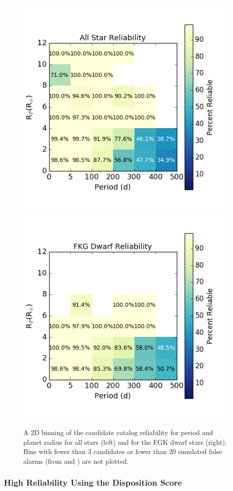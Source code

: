 \begin{figure}[h]
\begin{center}
\includegraphics[width=0.45\linewidth]{fig-AllReliabilityPR.png}
\includegraphics[width=0.45\linewidth]{fig-FgkReliabilityPR.png}
\caption{A 2D binning of the candidate catalog reliability for period and planet radius for all stars (left) and for the FGK dwarf stars (right). Bins with fewer than 3 candidates or fewer than 20 simulated false alarms (from \invtce{} and \scrtce{}) are not plotted.}
\label{f:prReliability}
\end{center}
\end{figure}



\subsubsection{High Reliability Using the Disposition Score}
\label{s:crscores}

